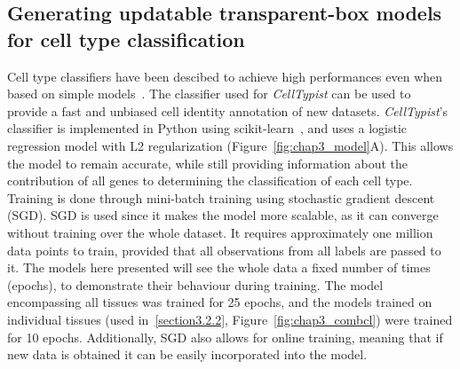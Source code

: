 \subsection{Generating updatable transparent-box models for cell type classification}
\label{section3.2.3}
Cell type classifiers have been descibed to achieve high performances even when based on simple models~\citep{abdelaal_comparison_2019,kohler_deep_2019}. The classifier used for \textit{CellTypist} can be used to provide a fast and unbiased cell identity annotation of new datasets. \textit{CellTypist}'s classifier is implemented in Python using scikit-learn~\citep{scikit-learn}, and uses a logistic regression model with L2 regularization (Figure~\ref{fig:chap3_model}A). This allows the model to remain accurate, while still providing information about the contribution of all genes to determining the classification of each cell type. Training is done through mini-batch training using stochastic gradient descent (SGD). SGD is used since it makes the model more scalable, as it can converge without training over the whole dataset. It requires approximately one million data points to train, provided that all observations from all labels are passed to it. The models here presented will see the whole data a fixed number of times (epochs), to demonstrate their behaviour during training. The model encompassing all tissues was trained for 25 epochs, and the models trained on individual tissues (used in~\ref{section3.2.2}, Figure~\ref{fig:chap3_combcl}) were trained for 10 epochs. Additionally, SGD also allows for online training, meaning that if new data is obtained it can be easily incorporated into the model.

